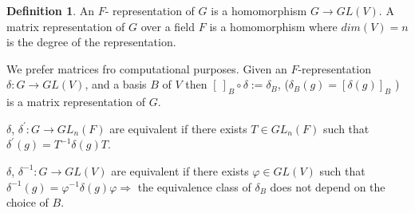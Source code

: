 \documentclass[12pt]{amsart}
\theoremstyle{definition}
\newtheorem{definition}[theorem]{Definition}
\begin{document}
\begin{definition}
An $F$- representation of $G$ is a homomorphism $G \rightarrow GL(V)$. A matrix representation of $G$ over a field $F$ is a homomorphism where $dim(V) = n$ is the degree of the representation.
\end{definition}

We prefer matrices fro computational purposes. Given an $F$-representation $\delta: G \rightarrow GL(V)$, and a basis $B$ of $V$ then $[ \  ]_{B} \circ \delta := \delta_{B}$, ($ \delta_{B} (g) = \left[ \delta (g) \right]_{B}$ ) is a matrix representation of $G$.

$\delta$, $\delta^{'}: G \rightarrow GL_{n} (F)$ are equivalent if there exists $T \in GL_{n} (F)$ such that $\delta^{'} (g) = T^{- 1} \delta (g) T$.

$\delta$, $\delta^{- 1}: G \rightarrow GL(V)$ are equivalent if there exists $\varphi \in GL(V)$ such that $\delta^{- 1} (g) = \varphi^{- 1} \delta (g) \varphi \Rightarrow$ the equivalence class of $\delta_{B}$ does not depend on the choice of $B$.
\end{document}
